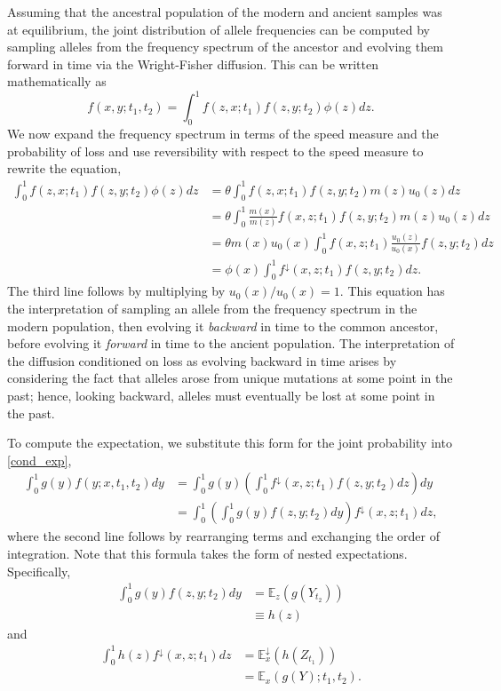 \documentclass[11pt, oneside]{article}   	%
\begin{document}
Assuming that the ancestral population of the modern and ancient samples was at equilibrium, the joint distribution of allele frequencies can be computed by sampling alleles from the frequency spectrum of the ancestor and evolving them forward in time via the Wright-Fisher diffusion. This can be written mathematically as
\[
f(x, y; t_1, t_2) = \int_0^1 f(z, x; t_1) f(z, y; t_2) \phi(z) dz.
\]
We now expand the frequency spectrum in terms of the speed measure and the probability of loss and use reversibility with respect to the speed measure to rewrite the equation,
\begin{align*}
\int_0^1 f(z, x; t_1) f(z, y; t_2) \phi(z) dz &= \theta \int_0^1 f(z, x; t_1)f(z, y; t_2)m(z)u_0(z)dz \\
&= \theta \int_0^1 \frac{m(x)}{m(z)}f(x,z;t_1)f(z,y;t_2)m(z)u_0(z)dz \\
&= \theta m(x) u_0(x) \int_0^1 f(x,z; t_1)\frac{u_0(z)}{u_0(x)} f(z,y;t_2) dz \\
&= \phi(x) \int_0^1 f^{\downarrow}(x, z; t_1)f(z, y; t_2)dz.
\end{align*}
The third line follows by multiplying by $u_0(x)/u_0(x)  = 1$. This equation has the interpretation of sampling an allele from the frequency spectrum in the modern population, then evolving it \emph{backward} in time to the common ancestor, before evolving it \emph{forward} in time to the ancient population. The interpretation of the diffusion conditioned on loss as evolving backward in time arises by considering the fact that alleles arose from unique mutations at some point in the past; hence, looking backward, alleles must eventually be lost at some point in the past.

To compute the expectation, we substitute this form for the joint probability into \eqref{cond_exp}, 
\begin{align*}
 \int_0^1 g(y) f(y; x, t_1, t_2)dy &= \int_0^1g(y)  \left( \int_0^1 f^{\downarrow}(x, z; t_1)f(z, y; t_2)dz \right) dy  \\
 &= \int_0^1 \left( \int_0^1 g(y) f(z, y; t_2)dy \right) f^{\downarrow}(x, z; t_1) dz,
\end{align*}
where the second line follows by rearranging terms and exchanging the order of integration. Note that this formula takes the form of nested expectations. Specifically,
\begin{align*}
\int_0^1 g(y) f(z, y; t_2) dy &= \mathbb{E}_z(g(Y_{t_2})) \\
&\equiv h(z)
\end{align*}
and
\begin{align*}
\int_0^1 h(z) f^\downarrow(x, z; t_1)dz &= \mathbb{E}_x^\downarrow(h(Z_{t_1})) \\
&= \mathbb{E}_x(g(Y); t_1, t_2).
\end{align*}
\end{document}
